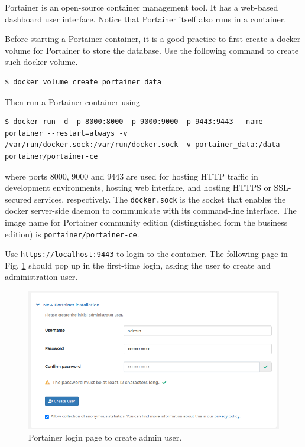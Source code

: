 Portainer is an open-source container management tool. It has a web-based dashboard user interface. Notice that Portainer itself also runs in a container.

Before starting a Portainer container, it is a good practice to first create a docker volume for Portainer to store the database. Use the following command to create such docker volume.
\begin{lstlisting}
$ docker volume create portainer_data
\end{lstlisting}
Then run a Portainer container using
\begin{lstlisting}
$ docker run -d -p 8000:8000 -p 9000:9000 -p 9443:9443 --name portainer --restart=always -v /var/run/docker.sock:/var/run/docker.sock -v portainer_data:/data portainer/portainer-ce
\end{lstlisting}
where ports 8000, 9000 and 9443 are used for hosting HTTP traffic in development environments, hosting web interface, and hosting HTTPS or SSL-secured services, respectively. The \verb|docker.sock| is the socket that enables the docker server-side daemon to communicate with its command-line interface. The image name for Portainer community edition (distinguished form the business edition) is \verb|portainer/portainer-ce|.

Use \verb|https://localhost:9443| to login to the container. The following page in Fig. \ref{ch:vac:fig:portainerlogin} should pop up in the first-time login, asking the user to create and administration user.
\begin{figure}[htbp]
	\centering
	\includegraphics[width=350pt]{chapters/part-3/figures/portainerlogin.png}
	\caption{Portainer login page to create admin user.} \label{ch:vac:fig:portainerlogin}
\end{figure}

